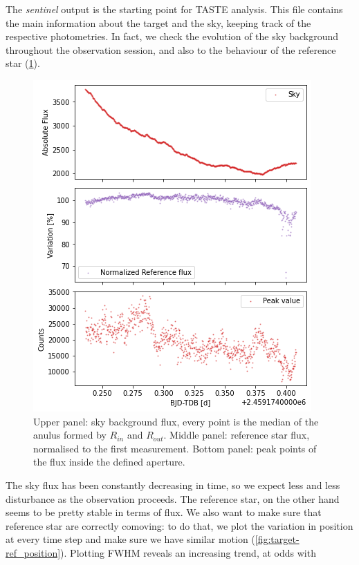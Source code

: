 \documentclass[a4paper,11pt,twocolumn]{article}
\begin{document}

\medskip

The \textit{sentinel} output is the starting point for TASTE analysis. This file 
contains the main information about the target and the sky, keeping track of the 
respective photometries. In fact, we check the evolution of the 
sky background throughout the observation session, and also to the behaviour 
of the reference star (\ref{fig:sky-ref}).
\begin{figure}
    \centering  
    \includegraphics[scale=0.5, angle=0]{../pictures/taste/sky-ref.png}
    \caption{Upper panel: sky background flux, every point is the median of the anulus
    formed by $R_{in}$ and $R_{out}$. Middle panel: reference star flux, 
    normalised to the first measurement. Bottom panel: peak points of the 
    flux inside the defined aperture.}
    \label{fig:sky-ref}
\end{figure}
The sky flux has been constantly decreasing in time, so we expect less and less 
disturbance as the observation proceeds. The reference star, on the other hand 
seems to be pretty stable in terms of flux. 
We also want to make sure that reference star are correctly comoving: to do that, 
we plot the variation in position at every time step and make sure we have 
similar motion (\ref{fig:target-ref_position}). Plotting FWHM reveals an increasing trend, at odds with 
\end{document}
